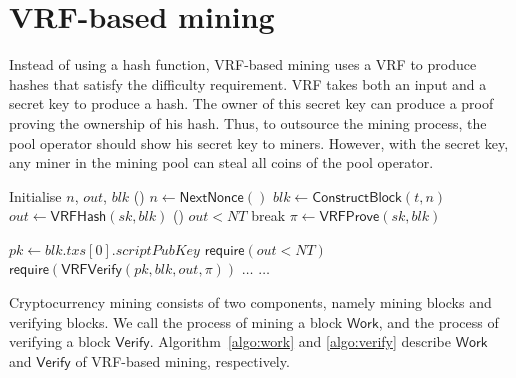 \section{VRF-based mining}
\label{sec:construction}

Instead of using a hash function, VRF-based mining uses a VRF to produce hashes that satisfy the difficulty requirement.
VRF takes both an input and a secret key to produce a hash.
The owner of this secret key can produce a proof proving the ownership of his hash.
Thus, to outsource the mining process, the pool operator should show his secret key to miners.
However, with the secret key, any miner in the mining pool can steal all coins of the pool operator.

\begin{algorithm}[]
\caption{$\mathsf{Work}(sk, t, NT)$.}\label{algo:work}
\SetAlgoLined\DontPrintSemicolon
{}
  Initialise $n$, $out$, $blk$ 
  \While () {$n \gets \mathsf{NextNonce}()$}{
    $blk \gets \mathsf{ConstructBlock}(t, n)$ 
    $out \gets \mathsf{VRFHash}(sk, blk)$ 
    \If () {$out < NT$}{
      break 
    }
  }
  $\pi \gets \mathsf{VRFProve}(sk, blk)$ 
   
\end{algorithm}



\begin{algorithm}[h]
\caption{$\mathsf{Verify}(blk, out, \pi, NT)$}\label{algo:verify}
\SetAlgoLined\DontPrintSemicolon
$pk \gets blk . txs[0] . scriptPubKey$ 
$\mathsf{require}(out < NT)$ 
$\mathsf{require}(\mathsf{VRFVerify}(pk, blk, out, \pi))$ \;
$\dots$ 
$\dots$ 
\end{algorithm}

Cryptocurrency mining consists of two components, namely mining blocks and verifying blocks.
We call the process of mining a block $\mathsf{Work}$, and the process of verifying a block $\mathsf{Verify}$.
Algorithm~\ref{algo:work} and \ref{algo:verify} describe $\mathsf{Work}$ and $\mathsf{Verify}$ of VRF-based mining, respectively.


